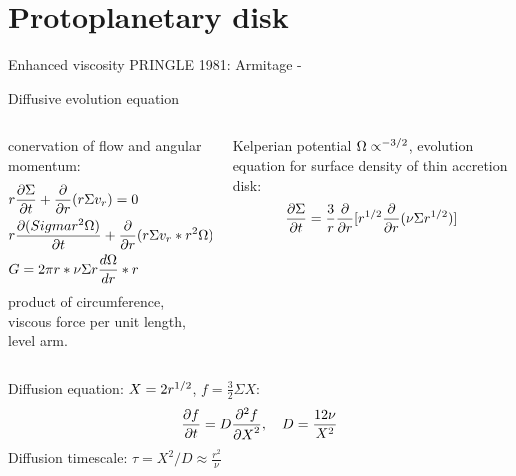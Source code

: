 \section{Protoplanetary disk}

\begin{wordonframe}{Enhanced viscosity}
PRINGLE 1981:
Armitage - 
\end{wordonframe}

\begin{frame}{Diffusive evolution equation}
\begin{columns}[T]\begin{column}{0.5\textwidth}
conervation of flow and angular momentum:
\begin{align*}
&r\PDy{t}{\Sigma}+\PDof{r}(r\Sigma v_r)=0\\
&r\PDy{t}{(Sigma r^2\Omega)}+\PDof{r}(r\Sigma v_r*r^2\Omega)=\frac{1}{2\pi}\PDy{r}{G}\\
&G=2\pi r*\nu\Sigma r\TDy{r}{\Omega}*r
\end{align*}
product of circumference, viscous force per unit length, level arm.
\end{column}\begin{column}{0.5\textwidth}
Kelperian potential $\Omega\propto\expy{-3/2}$, evolution equation for  surface density of thin accretion disk:
\[\PDy{t}{\Sigma}=\frac{3}{r}\PDof{r}[r\expy{1/2}\PDof{r}(\nu\Sigma r\expy{1/2})]\]
\end{column}\end{columns}
Diffusion equation: $X=2r\expy{1/2}$, $f=\frac{3}{2}\Sigma X$:
\[\PDy{t}{f}=D\PtwoDy{X}{f},\quad D=\frac{12\nu}{X^2}\]
Diffusion timescale: $\tau=X^2/D\approx\frac{r^2}{\nu}$
\end{frame}